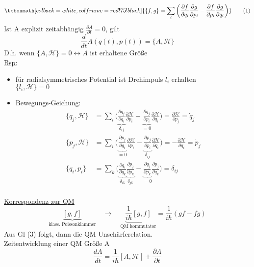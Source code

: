 \documentclass[titlepage,12pt,a4paper,ngerman]{report}
\newcommand{\tx}[1]{\textrm{#1}}
\newcommand{\ub}[1]{\underbrace{#1}}
\newcommand{\ham}{\mathcal{H}}
\newcommand{\rmbox}[1]{\tcboxmath[colback=white,colframe=red!75!black]{#1}} %
\begin{document}
{\begin{equation*}
\rmbox{ \{ f,g \} = \sum_i \bigg( \frac{\partial f}{\partial q_i} \frac{\partial g}{\partial p_i} - \frac{\partial f}{\partial p_i} \frac{\partial g}{\partial q_i} \bigg) } \tag{1}
\end{equation*}
Ist A explizit zeitabhängig $ \frac{\partial A}{\partial t} = 0 $, gilt
\begin{equation*}
\frac{d}{dt} A(q(t),p(t)) = \{A,\ham\} \tag{2}
\end{equation*}
D.h. wenn $ \{A,\ham\} = 0 \leftrightarrow A $ ist erhaltene Größe\\
\underline{Bsp:}
\begin{itemize}
	\item für radialsymmetrisches Potential ist Drehimpuls $ l_i $ erhalten\\
	$ \{l_i , \ham \} = 0 $
	\item Bewegungs-Geichung:\\
	\begin{align*}
	\{q_j,\ham \} &= \sum_i\bigg( \ub{\frac{\partial q_j}{\partial q_i}}_{\delta_{ij}} \frac{\partial \ham}{\partial p_i} - \ub{\frac{\partial q_j}{\partial p_i}}_{= 0} \frac{\partial \ham}{\partial q_i} \bigg) = \frac{\partial \ham}{\partial p_j} = \dot{q}_j\\
	\{p_j,\ham \} &= \sum_i\bigg( \ub{\frac{\partial p_j}{\partial q_i}}_{= 0} \frac{\partial \ham}{\partial p_i} - \ub{\frac{\partial p_j}{\partial p_i}}_{\delta_{ij}} \frac{\partial \ham}{\partial q_i} \bigg) = -\frac{\partial \ham}{\partial q_i} = \dot{p}_j\\
	\{q_i,p_i\} &= \sum_k \bigg( \ub{\frac{\partial q_i}{\partial q_k}}_{\delta_{ik}} \ub{\frac{\partial p_j}{\partial p_k}}_{\delta_{jk}} - \ub{\frac{\partial q_j}{\partial p_k}}_{= 0} \frac{\partial p_j}{\partial q_k} \bigg) = \delta_{ij}\\
	\end{align*}
\end{itemize}
\underline{Korrespondenz zur QM}
\begin{equation*}
\ub{[g,f]}_{\tx{klass. Poissonklammer}} \quad \longrightarrow \quad \ub{\frac{1}{i \hbar} [g,f]}_{\tx{QM kommutator}} = \frac{1}{i\hbar} (gf-fg) \tag{4}
\end{equation*}
Aus Gl (3) folgt, dann die QM Unschärferelation.\\
Zeitentwicklung einer QM Größe A
\begin{equation*}
\frac{d A}{d t} = \frac{1}{i \hbar} [A,\ham] + \frac{\partial A}{\partial t} 
\end{equation*}

}
\end{document}
